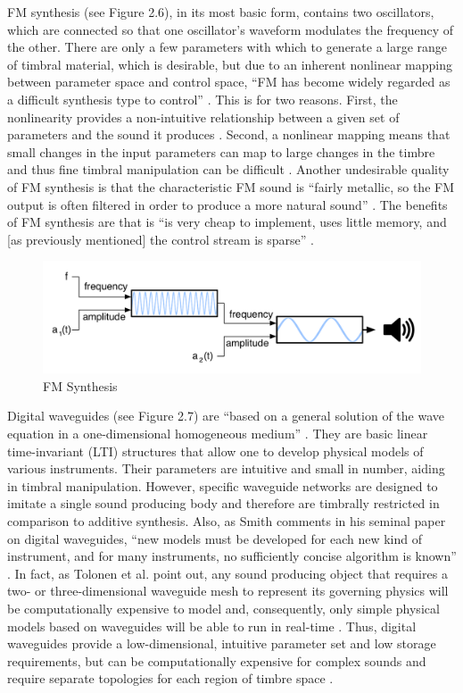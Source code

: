 \documentclass[a4paper,12pt]{report} 	%
\numberwithin{figure}{chapter}
\numberwithin{table}{chapter}
\numberwithin{equation}{chapter}
\begin{document}
\begin{flushleft}
FM synthesis (see Figure 2.6), in its most basic form, contains two oscillators, which are connected so that one oscillator's waveform modulates the frequency of the other. There are only a few parameters with which to generate a large range of timbral material, which is desirable, but due to an inherent nonlinear mapping between parameter space and control space, ``FM has become widely regarded as a difficult synthesis type to control'' \cite{Mitchell:2007fe}. This is for two reasons. First, the nonlinearity provides a non-intuitive relationship between a given set of parameters and the sound it produces \cite[p. 45]{Nicol:2005rp}. Second, a  nonlinear mapping means that small changes in the input parameters can map to large changes in the timbre and thus fine timbral manipulation can be difficult \cite[p. 2]{Jaffe:1995fv}. Another undesirable quality of FM synthesis is that the characteristic FM sound is ``fairly metallic, so the FM output is often filtered in order to produce a more natural sound'' \cite[p. 45]{Nicol:2005rp}. The benefits of FM synthesis are that is ``is very cheap to implement, uses little memory, and [as previously mentioned] the control stream is sparse'' \cite[p. 92]{Tolonen:1998bh}.
\\
\begin{figure}[h!]
\begin{center}
\includegraphics[scale=0.65]{FMSynthesis}
\caption[FM Synthesis]{FM Synthesis}
\end{center}
\end{figure}
Digital waveguides (see Figure 2.7) are ``based on a general solution of the wave equation in a one-dimensional homogeneous medium'' \cite[p. 63]{Tolonen:1998bh}. They are basic linear time-invariant (LTI) structures that allow one to develop physical models of various instruments. Their parameters are intuitive and small in number, aiding in timbral manipulation. However, specific waveguide networks are designed to imitate a single sound producing body and therefore are timbrally restricted in comparison to additive synthesis. Also, as Smith comments in his seminal paper on digital waveguides, ``new models must be developed for each new kind of instrument, and for many instruments, no sufficiently concise algorithm is known'' \cite[p. 86]{III:1992zn}. In fact, as Tolonen et al. point out, any sound producing object that requires a two- or three-dimensional waveguide mesh to represent its governing physics will be computationally expensive to model and, consequently, only simple physical models based on waveguides will be able to run in real-time \cite[p. 99-100]{Tolonen:1998bh}. Thus, digital waveguides provide a low-dimensional, intuitive parameter set and low storage requirements, but can be computationally expensive for complex sounds and require separate topologies for each region of timbre space \cite[p. 50]{Nicol:2005rp}.

\end{flushleft}
\end{document}
